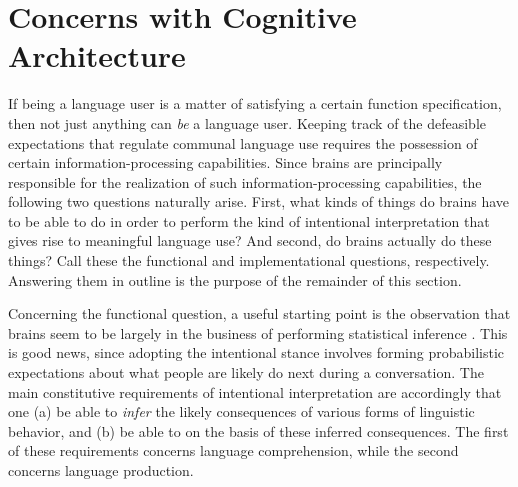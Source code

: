 \section{Concerns with Cognitive Architecture}

If being a language user is a matter of satisfying a certain function specification, then not just anything can \textit{be} a language user. Keeping track of the defeasible expectations that regulate communal language use requires the possession of certain information-processing capabilities. Since brains are principally responsible for the realization of such information-processing capabilities, the following two questions naturally arise. First, what kinds of things do brains have to be able to do in order to perform the kind of intentional interpretation that gives rise to meaningful language use? And second, do brains actually do these things? Call these the functional and implementational questions, respectively. Answering them in outline is the purpose of the remainder of this section. 

Concerning the functional question, a useful starting point is the observation that brains seem to be largely in the business of performing statistical inference \citep{Eliasmith:2007,clark:2013}. This is good news, since adopting the intentional stance involves forming probabilistic expectations about what people are likely do next during a conversation. The main constitutive requirements of intentional interpretation are accordingly that one (a) be able to \textit{infer} the likely consequences of various forms of linguistic behavior, and (b) be able to  on the basis of these inferred consequences. The first of these requirements concerns language comprehension, while the second concerns language production. 

